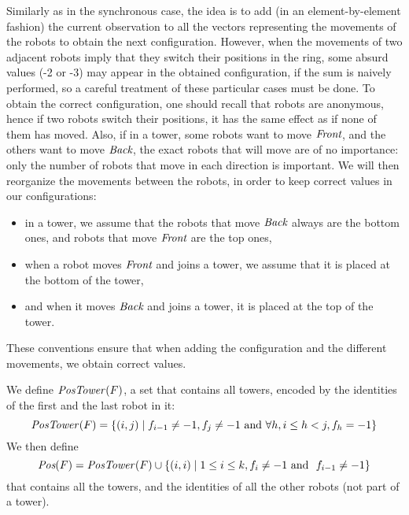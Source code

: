 Similarly as in the synchronous case, the idea is to add (in an element-by-element fashion)
 the current observation to all the vectors representing the movements of the robots 
 to obtain the next configuration. However, when the movements of two adjacent robots
 imply that they switch their positions in the ring, some absurd values (-2 or -3) 
may appear in the obtained configuration, if the sum is naively performed, 
so a careful treatment of these particular cases must be done. To obtain 
the correct configuration, one should recall that robots are anonymous, 
hence if two robots switch their positions, it has the same effect as if none 
of them has moved. Also, if in a tower, some robots want to move $\textit{Front}$, 
and the others want to move $\textit{Back}$, the exact robots that will move 
are of no importance:  only the number of robots that move in each direction is important. 
We will then reorganize the movements between the robots, in order
 to keep correct values in our configurations:  
 \begin{itemize}
 \item in a tower, we assume that the robots that move $\textit{Back}$
	 always are the bottom ones, and robots that move $\textit{Front}$ are the 
	 top ones, 
\item when a robot moves $\textit{Front}$ and joins a tower, we assume that 
	 it is placed at the bottom of the tower,  
\item and when it moves $\textit{Back}$ and joins a tower, it is 
 placed at the top of the tower. 
 \end{itemize}
 These conventions ensure that when adding the configuration  and the different
 movements, we obtain correct values.
  
 We define $\mathit{PosTower}(F)$, a set that contains all towers, encoded by the identities of the first and the last robot in it:  
 $$\mathit{PosTower}(F)=\{(i, j)\mid f_{i-1} \neq -1, f_j\neq -1\textrm{ and }\forall h, i\leq h< j, f_h=-1\}$$
 We then define
$$\textit{Pos}(F)=\mathit{PosTower}(F) 
 \cup\{(i, i)\mid 1\leq i\leq k, f_i \neq -1 \textrm{ and } \ f_{i-1} \neq -1 \}$$ 
 that contains all the towers, and the identities of all the other robots (not part of a tower).
 

